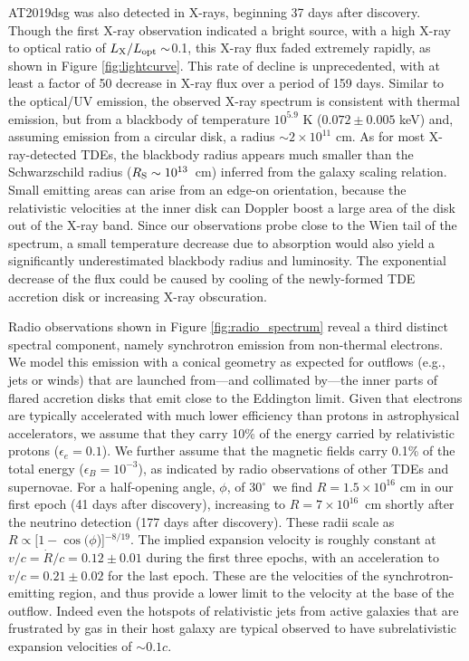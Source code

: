 \documentclass{nature_plusfigure}
\newcommand{\arcdeg}{\mbox{$^\circ$}}
\begin{document}
AT2019dsg was also detected in X-rays, beginning 37 days after discovery. Though the first X-ray observation indicated a bright source, with a high X-ray to optical ratio of $L_{\rm X}/L_{\rm opt} \sim $0.1, this X-ray flux faded extremely rapidly, as shown in Figure \ref{fig:lightcurve}. This rate of decline is unprecedented, with at least a factor of 50 decrease in X-ray flux over a period of 159 days. Similar to the optical/UV emission, the observed X-ray spectrum is consistent with thermal emission, but from a blackbody of temperature $10^{5.9}$ K ($0.072 \pm 0.005$ keV) and, assuming emission from a circular disk, a radius $\sim 2 \times 10^{11}$ cm. As for most X-ray-detected TDEs\cite{2017ApJ...838..149A, 2019MNRAS.487.4136W,2019ApJ...872..198V}, the blackbody radius appears much smaller than the Schwarzschild radius ($R_{\rm S} \sim 10^{13}$~cm) inferred from the galaxy scaling relation\cite{2013ApJ...764..184M}. Small emitting areas can arise from an edge-on orientation, because the relativistic velocities at the inner disk can Doppler boost a large area of the disk out of the X-ray band.  Since our observations probe close to the Wien tail of the spectrum, a small temperature decrease due to absorption would also yield a significantly underestimated blackbody radius and luminosity\cite{2019ApJ...872..198V}. The exponential decrease of the flux could be caused by cooling of the newly-formed TDE accretion disk\cite{2020MNRAS.492.5655M} or increasing X-ray obscuration.

Radio observations shown in Figure \ref{fig:radio_spectrum} reveal a third distinct spectral component, namely synchrotron emission from non-thermal electrons. We model this emission with a  conical geometry as expected for outflows (e.g., jets or winds) that are launched from---and collimated by---the inner parts of flared accretion disks that emit close to the Eddington limit.
Given that electrons are typically accelerated with much lower efficiency than protons in astrophysical accelerators\cite{2012A&A...538A..81M}, we assume that they carry 10\% of the energy carried by relativistic protons ($\epsilon_{e} = 0.1$). We further assume that the magnetic fields carry 0.1\% of the total energy ($\epsilon_{B} = 10^{-3}$), as indicated by radio observations of other TDEs\cite{2018ApJ...854...86E} and supernovae\cite{2013MNRAS.436.1258H}. For a half-opening angle, $\phi$, of 30\arcdeg\ we find $R = 1.5 \times 10^{16}$ cm in our first epoch (41 days after discovery), increasing to $R = 7 \times 10^{16}$~cm shortly after the neutrino detection (177 days after discovery).  These radii scale\cite{2013ApJ...772...78B} as $R \propto [1-\cos(\phi$)]$^{-8/19}$. The implied expansion velocity is roughly constant at $v/c = \dot{R}/c = 0.12 \pm 0.01 $ during the first three epochs, with an acceleration to $v/c = 0.21 \pm0.02$ for the last epoch.  These are the velocities of the synchrotron-emitting region, and thus provide a lower limit to the velocity at the base of the outflow.  Indeed even the hotspots of relativistic jets from active galaxies that are frustrated by gas in their host galaxy are typical observed\cite{2003PASA...20...69P} to have subrelativistic expansion velocities of $\sim0.1c$. 
\end{document}
